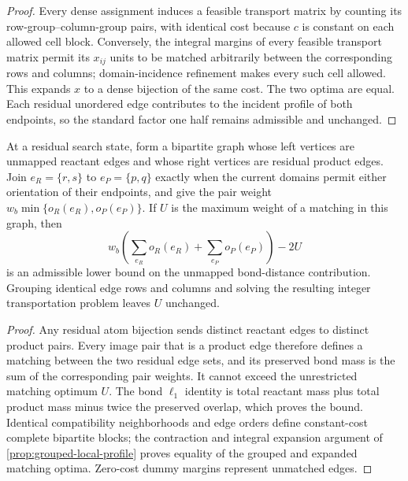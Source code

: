 \begin{proof}
Every dense assignment induces a feasible transport matrix by counting its
row-group--column-group pairs, with identical cost because $c$ is constant on
each allowed cell block.  Conversely, the integral margins of every feasible
transport matrix permit its $x_{ij}$ units to be matched arbitrarily between
the corresponding rows and columns; domain-incidence refinement makes every
such cell allowed.  This expands $x$ to a dense bijection of the same cost.
The two optima are equal.  Each residual unordered edge contributes to the
incident profile of both endpoints, so the standard factor one half remains
admissible and unchanged.
\end{proof}

\begin{proposition}
\label{prop:edge-transport}
At a residual search state, form a bipartite graph whose left vertices are
unmapped reactant edges and whose right vertices are residual product edges.
Join $e_R=\{r,s\}$ to $e_P=\{p,q\}$ exactly when the current domains permit
either orientation of their endpoints, and give the pair weight
$w_b\min\{o_R(e_R),o_P(e_P)\}$.  If $U$ is the maximum weight of a matching
in this graph, then
\[
  w_b\left(\sum_{e_R}o_R(e_R)+\sum_{e_P}o_P(e_P)\right)-2U
\]
is an admissible lower bound on the unmapped bond-distance contribution.
Grouping identical edge rows and columns and solving the resulting integer
transportation problem leaves $U$ unchanged.
\end{proposition}

\begin{proof}
Any residual atom bijection sends distinct reactant edges to distinct product
pairs.  Every image pair that is a product edge therefore defines a matching
between the two residual edge sets, and its preserved bond mass is the sum of
the corresponding pair weights.  It cannot exceed the unrestricted matching
optimum $U$.  The bond $\ell_1$ identity is total reactant mass plus total
product mass minus twice the preserved overlap, which proves the bound.
Identical compatibility neighborhoods and edge orders define constant-cost
complete bipartite blocks; the contraction and integral expansion argument of
\cref{prop:grouped-local-profile} proves equality of the grouped and expanded
matching optima.  Zero-cost dummy margins represent unmatched edges.
\end{proof}

